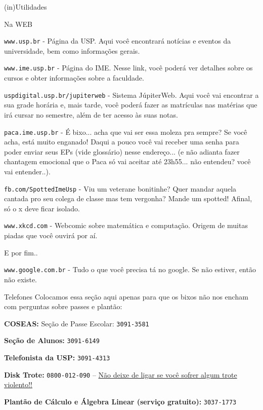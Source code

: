 \begin{secao}{(in)Utilidades}

\begin{subsecao}{Na WEB}

{\tt www.usp.br} - Página da USP. Aqui você encontrará notícias e eventos da
universidade, bem como informações gerais.

{\tt www.ime.usp.br} - Página do IME.
Nesse link, você poderá ver detalhes sobre os cursos e obter informações sobre
a faculdade.

{\tt uspdigital.usp.br/jupiterweb} - Sistema JúpiterWeb. Aqui você vai
encontrar a sua grade horária e, mais tarde, você poderá fazer as matrículas nas
matérias que irá cursar no semestre, além de ter acesso às suas notas.

{\tt paca.ime.usp.br} - É bixo... acha que vai ser essa moleza pra sempre? Se
você acha, está muito enganado! Daqui a pouco você vai receber uma senha para
poder enviar seus EPs (vide glossário) nesse endereço... (e não adianta fazer
chantagem emocional que o Paca só vai aceitar até 23h55... não entendeu? você
vai entender..).

{\tt fb.com/SpottedImeUsp} - Viu um veterane bonitinhe? Quer mandar aquela
cantada pro seu colega de classe mas tem vergonha? Mande um spotted! Afinal,
só o x deve ficar isolado.

{\tt www.xkcd.com} - Webcomic sobre matemática e computação. Origem de muitas
piadas que você ouvirá por aí.

E por fim..

{\tt www.google.com.br} - Tudo o que você precisa tá no google. Se não estiver,
então não existe.

\end{subsecao}

\begin{subsecao}{Telefones}
Colocamos essa seção aqui apenas para que os bixos não nos encham com perguntas
sobre passes e plantão:

{\bf COSEAS:} Seção de Passe Escolar: {\tt 3091-3581}

{\bf Seção de Alunos:} {\tt 3091-6149}

{\bf Telefonista da USP:} {\tt 3091-4313}

{\bf Disk Trote:} {\tt 0800-012-090} -- \underline{Não deixe de ligar se você sofrer algum trote violento!!}

{\bf Plantão de Cálculo e Álgebra Linear (serviço gratuito):} {\tt 3037-1773}

\end{subsecao}
\end{secao}
